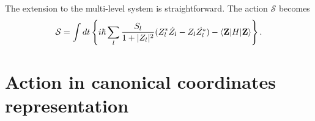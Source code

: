 \documentclass[11pt]{book} %
\begin{document}
The extension to the multi-level system is straightforward. The action $\mathcal{S}$ becomes
\begin{equation}
  \mathcal{S} = \int dt \left\{ i\hbar \sum_l \frac{S_l}{1+|Z_l|^2}
  (Z_l^*\dot{Z_l}-Z_l\dot{Z_l^*}) - \braket{{\bf Z}|H|{\bf Z}} \right\} .
\end{equation}

\section{Action in canonical coordinates representation}




\end{document}
